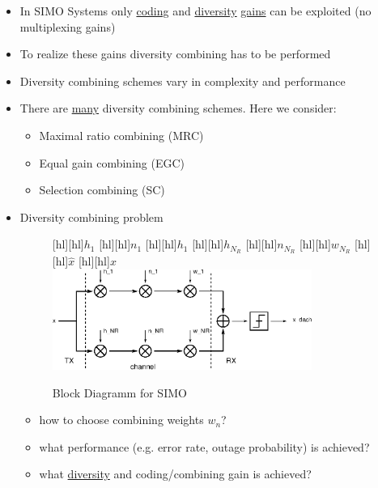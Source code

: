 \documentclass[a4paper, 10pt]{article}
\begin{document}
\begin{itemize}
	\item In SIMO Systems only \underline{coding} and \underline{diversity} \underline{gains} can be exploited (no multiplexing gains)
	\item To realize these gains diversity combining has to be performed
	\item Diversity combining schemes vary in complexity and performance
	\item There are \underline{many} diversity combining schemes. Here we consider:
	\begin{itemize}
		\item Maximal ratio combining (MRC)
		\item Equal gain combining (EGC)
		\item Selection combining (SC)
	\end{itemize}
	\item Diversity combining problem
	\begin{figure}[ht]
		\centering
		[hl][hl]{$h_1$}
		[hl][hl]{$n_1$}
		[hl][hl]{$h_1$}
		[hl][hl]{$h_{N_R}$}
		[hl][hl]{$n_{N_R}$}
		[hl][hl]{$w_{N_R}$}
		[hl][hl]{$\hat{x}$}
		[hl][hl]{$x$}		
		\includegraphics[width=0.8\textwidth]{Multi_Channel}
		\caption{Block Diagramm for SIMO}
		\label{fig:Multi_Channel}	
	\end{figure}		
	
	\begin{itemize}
		\item how to choose combining weights $w_n$?
		\item what performance (e.g. error rate, outage probability) is achieved?
		\item what \underline{diversity} and coding/combining gain is achieved?
	\end{itemize}
\end{itemize}
\end{document}
